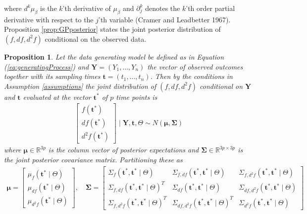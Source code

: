 \documentclass[11pt,]{article}
\newtheorem{proposition}{Proposition}
\theoremstyle{nonumberplain}
\begin{document}
where \(d^k\!\mu_\beta\) is the \(k\)'th derivative of \(\mu_\beta\) and
\(\partial_j^k\) denotes the \(k\)'th order partial derivative with
respect to the \(j\)'th variable (Cramer and Leadbetter 1967).
Proposition \ref{prop:GPposterior} states the joint posterior
distribution of \((f, df, d^2\!f)\) conditional on the observed data.

\vspace{0.2cm}

\begin{proposition}
Let the data generating model be defined as in Equation (\ref{eq:generatingProcess}) and $\mathbf{Y} = (Y_1, \ldots, Y_n)$ the vector of observed outcomes together with its sampling times $\mathbf{t} = (t_1, \ldots, t_n)$. Then by the conditions in Assumption \ref{assumptions} the joint distribution of $(f, df, d^2\!f)$ conditional on $\mathbf{Y}$ and $\mathbf{t}$ evaluated at the vector $\mathbf{t}^\ast$ of $p$ time points is
\begin{align*}
\begin{bmatrix}f(\mathbf{t}^\ast)\\ df(\mathbf{t}^\ast)\\ d^2\!f(\mathbf{t}^\ast)\end{bmatrix} \mid \mathbf{Y}, \mathbf{t}, \Theta \sim N\left(\bm{\mu},  \bm{\Sigma}\right)
\end{align*}
where $\bm{\mu} \in \mathbb{R}^{3p}$ is the column vector of posterior expectations and $\bm{\Sigma} \in \mathbb{R}^{3p \times 3p}$ is the joint posterior covariance matrix. Partitioning these as
\begin{align*}
  \bm{\mu} = \begin{bmatrix}\mu_{f}(\mathbf{t^\ast} \mid \Theta)\\ \mu_{df}(\mathbf{t^\ast} \mid \Theta)\\ \mu_{d^2\!f}(\mathbf{t^\ast} \mid \Theta)\end{bmatrix}, \quad \bm{\Sigma} = \begin{bmatrix}\Sigma_{f}(\mathbf{t^\ast},\mathbf{t^\ast} \mid \Theta) &  \Sigma_{f,df}(\mathbf{t^\ast},\mathbf{t^\ast} \mid \Theta) & \Sigma_{f,d^2\!f}(\mathbf{t^\ast},\mathbf{t^\ast} \mid \Theta)\\  \Sigma_{f,df}(\mathbf{t^\ast},\mathbf{t^\ast} \mid \Theta)^T & \Sigma_{df}(\mathbf{t^\ast},\mathbf{t^\ast} \mid \Theta) & \Sigma_{df,d^2\!f}(\mathbf{t^\ast},\mathbf{t^\ast} \mid \Theta)\\ \Sigma_{f,d^2\!f}(\mathbf{t^\ast}, \mathbf{t^\ast} \mid \Theta)^T & \Sigma_{df,d^2\!f}(\mathbf{t^\ast}, \mathbf{t^\ast} \mid \Theta)^T & \Sigma_{d^2\!f}(\mathbf{t^\ast}, \mathbf{t^\ast} \mid \Theta)\end{bmatrix} 

\end{align*}
\end{proposition}
\end{document}
